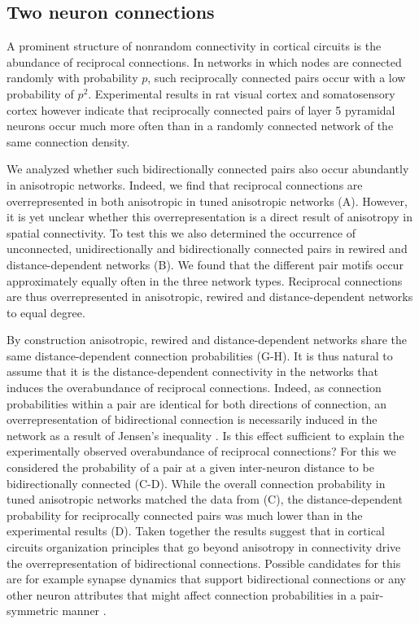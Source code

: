\subsection*{Two neuron connections}

A prominent structure of nonrandom connectivity in cortical circuits
is the abundance of reciprocal connections. In networks in which nodes
are connected randomly with probability $p$, such reciprocally connected
pairs occur with a low probability of $p^2$. Experimental results in
 rat visual cortex \cite{Song2005} and somatosensory cortex
\cite{Markram1997, Perin2011} however indicate that reciprocally
connected pairs of layer 5 pyramidal neurons occur much more often
than in a randomly connected network of the same connection density.

We analyzed whether such bidirectionally connected pairs also occur
abundantly in anisotropic networks. Indeed, we find that reciprocal
connections are overrepresented in both anisotropic in tuned
anisotropic networks (A). However, it is yet
unclear whether this overrepresentation is a direct result of
anisotropy in spatial connectivity. To test this we also determined
the occurrence of unconnected, unidirectionally and bidirectionally
connected pairs in rewired and distance-dependent networks
(B). We found that the different pair motifs
occur approximately equally often in the three network
types. Reciprocal connections are thus overrepresented in anisotropic,
rewired and distance-dependent networks to equal degree.



By construction anisotropic, rewired and distance-dependent networks
share the same distance-dependent connection probabilities
(G-H). It is thus natural to assume that it
is the distance-dependent connectivity in the networks that induces
the overabundance of reciprocal connections. Indeed, as connection
probabilities within a pair are identical for both directions of
connection, an overrepresentation of bidirectional connection is
necessarily induced in the network as a result of Jensen's inequality
\cite{Hoffmann2017}. Is this effect sufficient to explain the
experimentally observed overabundance of reciprocal connections? For
this we considered the probability of a pair at a given inter-neuron
distance to be bidirectionally connected
(C-D). While the overall connection probability
in tuned anisotropic networks matched the data from
\textcite{Perin2011} (C), the
distance-dependent probability for reciprocally connected pairs was
much lower than in the experimental results
(D). Taken together the results suggest that in
cortical circuits organization principles that go beyond anisotropy in
connectivity drive the overrepresentation of bidirectional
connections. Possible candidates for this are for example synapse
dynamics that support bidirectional connections \cite{Clopath2010} or
any other neuron attributes that might affect connection probabilities
in a pair-symmetric manner \cite{Hoffmann2017, Lee2016a}.

